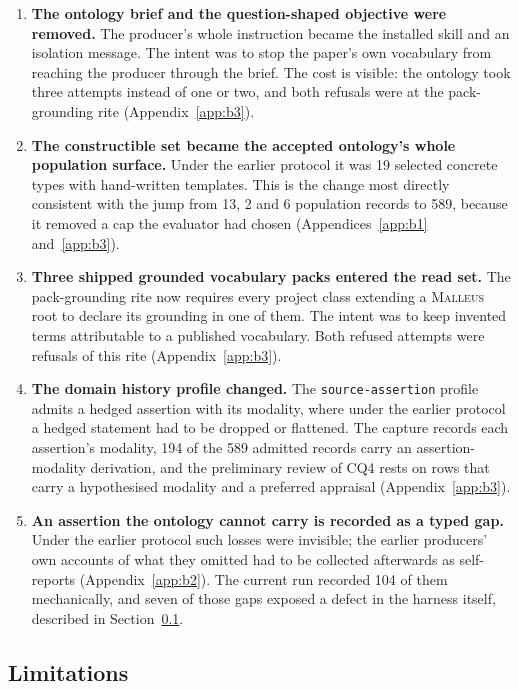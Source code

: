\documentclass[10pt]{article}
\newcommand{\malleus}{\textsc{Malleus}}
\newcommand{\code}[1]{\texttt{#1}}
\begin{document}
\begin{enumerate}
\item \textbf{The ontology brief and the question-shaped objective were removed.} The producer's whole instruction became the installed skill and an isolation message. The intent was to stop the paper's own vocabulary from reaching the producer through the brief. The cost is visible: the ontology took three attempts instead of one or two, and both refusals were at the pack-grounding rite (Appendix~\ref{app:b3}).
\item \textbf{The constructible set became the accepted ontology's whole population surface.} Under the earlier protocol it was 19 selected concrete types with hand-written templates. This is the change most directly consistent with the jump from 13, 2 and 6 population records to 589, because it removed a cap the evaluator had chosen (Appendices~\ref{app:b1} and~\ref{app:b3}).
\item \textbf{Three shipped grounded vocabulary packs entered the read set.} The pack-grounding rite now requires every project class extending a \malleus{} root to declare its grounding in one of them. The intent was to keep invented terms attributable to a published vocabulary. Both refused attempts were refusals of this rite (Appendix~\ref{app:b3}).
\item \textbf{The domain history profile changed.} The \code{source-assertion} profile admits a hedged assertion with its modality, where under the earlier protocol a hedged statement had to be dropped or flattened. The capture records each assertion's modality, 194 of the 589 admitted records carry an assertion-modality derivation, and the preliminary review of CQ4 rests on rows that carry a hypothesised modality and a preferred appraisal (Appendix~\ref{app:b3}).
\item \textbf{An assertion the ontology cannot carry is recorded as a typed gap.} Under the earlier protocol such losses were invisible; the earlier producers' own accounts of what they omitted had to be collected afterwards as self-reports (Appendix~\ref{app:b2}). The current run recorded 104 of them mechanically, and seven of those gaps exposed a defect in the harness itself, described in Section~\ref{sec:limitations}.
\end{enumerate}

\subsection{Limitations}
\label{sec:limitations}
\end{document}
